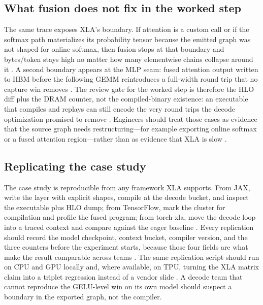 \subsection{What fusion does not fix in the worked step}

The same trace exposes XLA's boundary. If attention is a custom call or if the softmax path materializes its probability tensor because the emitted graph was not shaped for online softmax, then fusion stops at that boundary and bytes/token stays high no matter how many elementwise chains collapse around it \citep{dao2022flashattention,openxla2024,memoryfloor2026}. A second boundary appears at the MLP seam: fused attention output written to HBM before the following GEMM reintroduces a full-width round trip that no capture win removes \citep{memoryfloor2026,taxbreak2026}. The review gate for the worked step is therefore the HLO diff plus the DRAM counter, not the compiled-binary existence: an executable that compiles and replays can still encode the very round trips the decode optimization promised to remove \citep{chen2020compilerbasedhardw,patel2025llminference}. Engineers should treat those cases as evidence that the source graph needs restructuring---for example exporting online softmax or a fused attention region---rather than as evidence that XLA is slow \citep{yirage2026,dao2022flashattention}.

\subsection{Replicating the case study}

The case study is reproducible from any framework XLA supports. From JAX, write the layer with explicit shapes, compile at the decode bucket, and inspect the executable plus HLO dump; from TensorFlow, mark the cluster for compilation and profile the fused program; from torch-xla, move the decode loop into a traced context and compare against the eager baseline \citep{openxla2024,patel2025llminference}. Every replication should record the model checkpoint, context bucket, compiler version, and the three counters before the experiment starts, because those four fields are what make the result comparable across teams \citep{memoryfloor2026,taxbreak2026}. The same replication script should run on CPU and GPU locally and, where available, on TPU, turning the XLA matrix claim into a triplet regression instead of a vendor slide \citep{openxla2024,chen2020compilerbasedhardw}. A decode team that cannot reproduce the GELU-level win on its own model should suspect a boundary in the exported graph, not the compiler.

